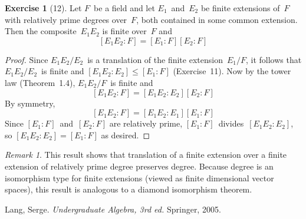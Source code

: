 \documentclass[letterpaper,12pt]{article}
\theoremstyle{definition}
\newtheorem*{exer}{Exercise}
\theoremstyle{remark}
\newtheorem*{rmk}{Remark}
\theoremstyle{direction}
\begin{document}
\begin{exer}[12]
Let \(F\)~be a field and let \(E_1\)~and~\(E_2\) be finite extensions of~\(F\) with relatively prime degrees over~\(F\), both contained in some common extension. Then the composite~\(E_1E_2\) is finite over~\(F\) and
\[[E_1E_2:F]=[E_1:F][E_2:F]\]
\end{exer}
\begin{proof}
Since \(E_1E_2/E_2\)~is a translation of the finite extension~\(E_1/F\), it follows that \(E_1E_2/E_2\)~is finite and \([E_1E_2:E_2]\le[E_1:F]\) (Exercise~11). Now by the tower law (Theorem~1.4), \(E_1E_2/F\)~is finite and
\[[E_1E_2:F]=[E_1E_2:E_2][E_2:F]\]
By symmetry,
\[[E_1E_2:F]=[E_1E_2:E_1][E_1:F]\]
Since \([E_1:F]\)~and~\([E_2:F]\) are relatively prime, \([E_1:F]\)~divides~\([E_1E_2:E_2]\), so \([E_1E_2:E_2]=[E_1:F]\) as desired.
\end{proof}
\begin{rmk}
This result shows that translation of a finite extension over a finite extension of relatively prime degree preserves degree. Because degree is an isomorphism type for finite extensions (viewed as finite dimensional vector spaces), this result is analogous to a diamond isomorphism theorem.
\end{rmk}

\begin{thebibliography}{0}
 Lang, Serge. \textit{Undergraduate Algebra, 3rd ed.} Springer, 2005.
\end{thebibliography}
\end{document}
